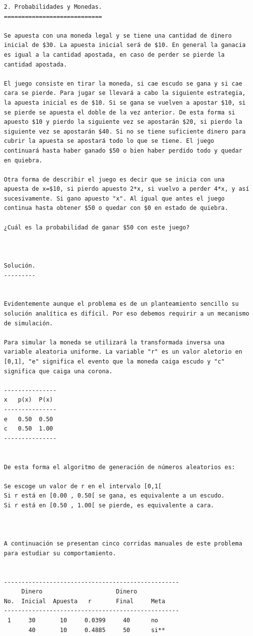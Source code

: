 \begin{verbatim}
2. Probabilidades y Monedas.
============================

Se apuesta con una moneda legal y se tiene una cantidad de dinero inicial de $30. La apuesta inicial será de $10. En general la ganacia es igual a la cantidad apostada, en caso de perder se pierde la cantidad apostada.

El juego consiste en tirar la moneda, si cae escudo se gana y si cae cara se pierde. Para jugar se llevará a cabo la siguiente estrategia, la apuesta inicial es de $10. Si se gana se vuelven a apostar $10, si se pierde se apuesta el doble de la vez anterior. De esta forma si apuesto $10 y pierdo la siguiente vez se apostarán $20, si pierdo la siguiente vez se apostarán $40. Si no se tiene suficiente dinero para cubrir la apuesta se apostará todo lo que se tiene. El juego continuará hasta haber ganado $50 o bien haber perdido todo y quedar en quiebra.

Otra forma de describir el juego es decir que se inicia con una apuesta de x=$10, si pierdo apuesto 2*x, si vuelvo a perder 4*x, y así sucesivamente. Si gano apuesto "x". Al igual que antes el juego continua hasta obtener $50 o quedar con $0 en estado de quiebra.

¿Cuál es la probabilidad de ganar $50 con este juego?



Solución.
---------


Evidentemente aunque el problema es de un planteamiento sencillo su solución analítica es difícil. Por eso debemos requirir a un mecanismo de simulación.

Para simular la moneda se utilizará la transformada inversa una variable aleatoria uniforme. La variable "r" es un valor aletorio en [0,1], "e" significa el evento que la moneda caiga escudo y "c" significa que caiga una corona.

---------------
x   p(x)  P(x)
---------------
e   0.50  0.50
c   0.50  1.00
---------------

 
De esta forma el algoritmo de generación de números aleatorios es:

Se escoge un valor de r en el intervalo [0,1[
Si r está en [0.00 , 0.50[ se gana, es equivalente a un escudo.
Si r está en [0.50 , 1.00[ se pierde, es equivalente a cara.



A continuación se presentan cinco corridas manuales de este problema para estudiar su comportamiento.


--------------------------------------------------
     Dinero                     Dinero
No.  Inicial  Apuesta   r       Final     Meta
--------------------------------------------------
 1     30       10     0.0399     40      no
       40       10     0.4885     50      si**


\end{verbatim}
